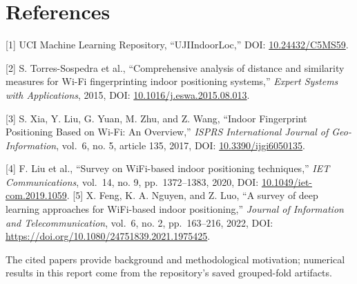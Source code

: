 \documentclass[
  10pt,
  a4paper,
]{article}
\begin{document}
\section{References}\label{references}

{[}1{]} UCI Machine Learning Repository, ``UJIIndoorLoc,'' DOI:
\href{https://doi.org/10.24432/C5MS59}{10.24432/C5MS59}.

{[}2{]} S. Torres-Sospedra et al., ``Comprehensive analysis of distance
and similarity measures for Wi-Fi fingerprinting indoor positioning
systems,'' \emph{Expert Systems with Applications}, 2015, DOI:
\href{https://doi.org/10.1016/j.eswa.2015.08.013}{10.1016/j.eswa.2015.08.013}.

{[}3{]} S. Xia, Y. Liu, G. Yuan, M. Zhu, and Z. Wang, ``Indoor
Fingerprint Positioning Based on Wi-Fi: An Overview,'' \emph{ISPRS
International Journal of Geo-Information}, vol.~6, no. 5, article 135,
2017, DOI:
\href{https://doi.org/10.3390/ijgi6050135}{10.3390/ijgi6050135}.

{[}4{]} F. Liu et al., ``Survey on WiFi-based indoor positioning
techniques,'' \emph{IET Communications}, vol.~14, no. 9, pp.~1372--1383,
2020, DOI:
\href{https://doi.org/10.1049/iet-com.2019.1059}{10.1049/iet-com.2019.1059}.
{[}5{]} X. Feng, K. A. Nguyen, and Z. Luo, ``A survey of deep learning
approaches for WiFi-based indoor positioning,'' \emph{Journal of
Information and Telecommunication}, vol.~6, no. 2, pp.~163--216, 2022,
DOI:
\url{https://doi.org/10.1080/24751839.2021.1975425}.

The cited papers provide background and methodological motivation;
numerical results in this report come from the repository's saved
grouped-fold artifacts.
\end{document}
